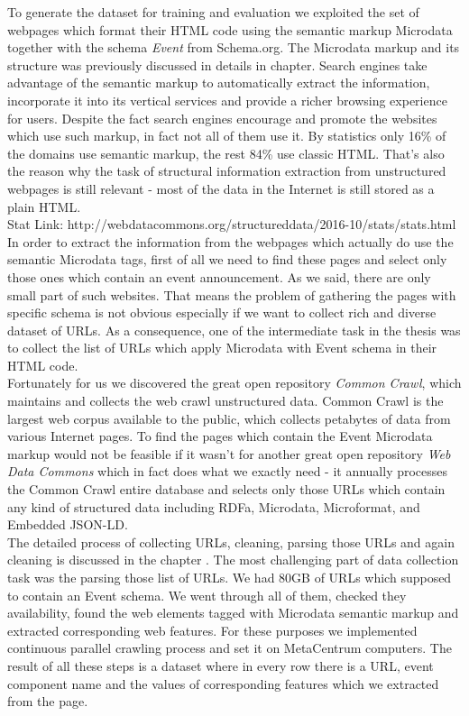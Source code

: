 To generate the dataset for training and evaluation we exploited the set of webpages which format their HTML code using the semantic markup Microdata together with the schema \textit{Event} from Schema.org. The Microdata markup and its structure was previously discussed in details in  chapter. Search engines take advantage of the semantic markup to automatically extract the information, incorporate it into its vertical services and provide a richer browsing experience for users. Despite the fact search engines encourage and promote the websites which use such markup, in fact not all of them use it. By statistics only 16\% of the domains use semantic markup, the rest 84\% use classic HTML. That's also the reason why the task of structural information extraction from unstructured webpages is still relevant - most of the data in the Internet is still stored as a plain HTML.\\ 

Stat Link: http://webdatacommons.org/structureddata/2016-10/stats/stats.html  \\

In order to extract the information from the webpages which actually do use the semantic Microdata tags, first of all we need to find these pages and select only those ones which contain an event announcement. As we said, there are only small part of such websites. That means the problem of gathering the pages with specific schema is not obvious especially if we want to collect rich and diverse dataset of URLs. As a consequence, one of the intermediate task in the thesis was to collect the list of URLs which apply Microdata with Event schema in their HTML code. \\

Fortunately for us we discovered the great open repository \textit{Common Crawl}, which maintains and collects the web crawl unstructured data. Common Crawl is the largest web corpus available to the public, which collects petabytes of data from various Internet pages. To find the pages which contain the Event Microdata markup would not be feasible if it wasn't for another great open repository \textit{Web Data Commons} which in fact does what we exactly need - it annually processes the Common Crawl entire database and selects only those URLs which contain any kind of structured data including RDFa, Microdata, Microformat, and Embedded JSON-LD. \\

The detailed process of collecting URLs, cleaning, parsing those URLs and again cleaning is discussed in the chapter . The most challenging part of data collection task was the parsing those list of URLs. We had 80GB of URLs which supposed to contain an Event schema. We went through all of them, checked they availability, found the web elements tagged with Microdata semantic markup and extracted corresponding web features. For these purposes we implemented continuous parallel crawling process and set it on MetaCentrum computers. The result of all these steps is a dataset where in every row there is a URL, event component name and the values of corresponding features which we extracted from the page.\\ 

